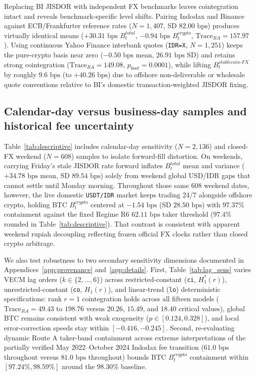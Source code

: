 Replacing BI JISDOR with independent FX benchmarks leaves cointegration intact and reveals benchmark-specific level shifts. Pairing Indodax and Binance against ECB/Frankfurter reference rates ($N = 1,407$, SD $82.00\text{ bps}$) produces virtually identical means ($+30.31\text{ bps}$ $B_t^{total}$, $-0.94\text{ bps}$ $B_t^{crypto}$, $\text{Trace}_{RA} = 157.97$). Using continuous Yahoo Finance interbank quotes (\texttt{IDR=X}, $N = 1,251$) keeps the pure-crypto basis near zero ($-0.50\text{ bps}$ mean, $26.91\text{ bps}$ SD) and retains strong cointegration ($\text{Trace}_{RA} = 149.08$, $p_{boot} = 0.0001$), while lifting $B_t^{stablecoin\text{-}FX}$ by roughly $9.6\text{ bps}$ (to $+40.26\text{ bps}$) due to offshore non-deliverable or wholesale quote conventions relative to BI's domestic transaction-weighted JISDOR fixing.

\subsection{Calendar-day versus business-day samples and historical fee uncertainty}
Table~\ref{tab:descriptive} includes calendar-day sensitivity ($N = 2,136$) and closed-FX weekend ($N = 608$) samples to isolate forward-fill distortion. On weekends, carrying Friday's stale JISDOR rate forward inflates $B_t^{total}$ mean and variance ($+34.78\text{ bps}$ mean, SD $89.54\text{ bps}$) solely from weekend global USD/IDR gaps that cannot settle until Monday morning. Throughout those same 608 weekend dates, however, the live domestic \texttt{USDT/IDR} market keeps trading 24/7 alongside offshore crypto, holding BTC $B_t^{crypto}$ centered at $-1.54\text{ bps}$ (SD $28.50\text{ bps}$) with $97.37\%$ containment against the fixed Regime R6 $62.11\text{ bps}$ taker threshold ($97.4\%$ rounded in Table~\ref{tab:descriptive}). That contrast is consistent with apparent weekend rupiah decoupling reflecting frozen official FX clocks rather than closed crypto arbitrage.

We also test robustness to two secondary sensitivity dimensions documented in Appendices~\ref{app:provenance} and~\ref{app:details}. First, Table~\ref{tab:lag_sens} varies VECM lag orders ($k \in \{2,\dots,6\}$) across restricted-constant (\texttt{ci}, $H_1^*(r)$), unrestricted-constant (\texttt{co}, $H_1(r)$), and linear-trend (\texttt{lo}) deterministic specifications: rank $r=1$ cointegration holds across all fifteen models ($\text{Trace}_{RA} = 49.43$ to $198.76$ versus $20.26$, $15.49$, and $18.40$ critical values), global BTC remains consistent with weak exogeneity ($p \in [0.124, 0.328]$), and local error-correction speeds stay within $[-0.416, -0.245]$. Second, re-evaluating dynamic Route A taker-band containment across extreme interpretations of the partially verified May 2022--October 2024 Indodax fee transition ($61.0\text{ bps}$ throughout versus $81.0\text{ bps}$ throughout) bounds BTC $B_t^{crypto}$ containment within $[97.24\%, 98.59\%]$ around the $98.30\%$ baseline.

